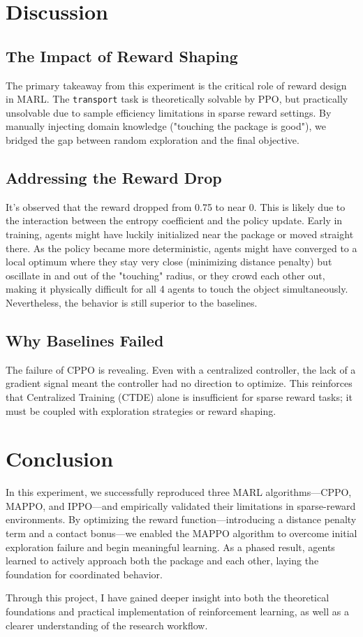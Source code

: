 \documentclass[12pt, a4paper]{article}
\begin{document}
\section{Discussion}

\subsection{The Impact of Reward Shaping}
The primary takeaway from this experiment is the critical role of reward design in MARL. The \texttt{transport} task is theoretically solvable by PPO, but practically unsolvable due to sample efficiency limitations in sparse reward settings. By manually injecting domain knowledge ("touching the package is good"), we bridged the gap between random exploration and the final objective.

\subsection{Addressing the Reward Drop}
It's observed that the reward dropped from 0.75 to near 0. This is likely due to the interaction between the entropy coefficient and the policy update. Early in training, agents might have luckily initialized near the package or moved straight there. As the policy became more deterministic, agents might have converged to a local optimum where they stay very close (minimizing distance penalty) but oscillate in and out of the "touching" radius, or they crowd each other out, making it physically difficult for all 4 agents to touch the object simultaneously. Nevertheless, the behavior is still superior to the baselines.

\subsection{Why Baselines Failed}
The failure of CPPO is revealing. Even with a centralized controller, the lack of a gradient signal meant the controller had no direction to optimize. This reinforces that Centralized Training (CTDE) alone is insufficient for sparse reward tasks; it must be coupled with exploration strategies or reward shaping.

\section{Conclusion}
In this experiment, we successfully reproduced three MARL algorithms—CPPO, MAPPO, and IPPO—and empirically validated their limitations in sparse-reward environments. By optimizing the reward function—introducing a distance penalty term and a contact bonus—we enabled the MAPPO algorithm to overcome initial exploration failure and begin meaningful learning. As a phased result, agents learned to actively approach both the package and each other, laying the foundation for coordinated behavior.

Through this project, I have gained deeper insight into both the theoretical foundations and practical implementation of reinforcement learning, as well as a clearer understanding of the research workflow.
\end{document}
